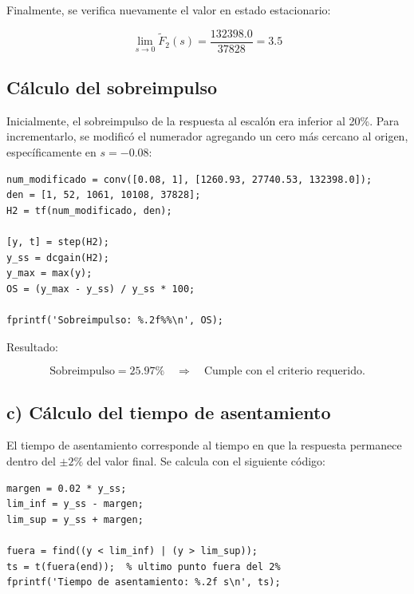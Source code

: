 \documentclass[11pt,letterpaper]{article}
\begin{document}
Finalmente, se verifica nuevamente el valor en estado estacionario:

\begin{equation}
\lim_{s \to 0} \tilde{F}_2(s) = \frac{132398.0}{37828} = \boxed{3.5}
\end{equation}

\subsection{Cálculo del sobreimpulso}

Inicialmente, el sobreimpulso de la respuesta al escalón era inferior al 20\%. Para incrementarlo, se modificó el numerador agregando un cero más cercano al origen, específicamente en $s = -0.08$:

\begin{lstlisting}[caption={Modificación del numerador para ajustar sobreimpulso}]
num_modificado = conv([0.08, 1], [1260.93, 27740.53, 132398.0]);
den = [1, 52, 1061, 10108, 37828];
H2 = tf(num_modificado, den);

[y, t] = step(H2);
y_ss = dcgain(H2);
y_max = max(y);
OS = (y_max - y_ss) / y_ss * 100;

fprintf('Sobreimpulso: %.2f%%\n', OS);
\end{lstlisting}

Resultado:

\begin{equation}
\text{Sobreimpulso} = 25.97\% \quad \Rightarrow \quad \text{Cumple con el criterio requerido.}
\end{equation}

\vspace{1em}

\subsection*{c) Cálculo del tiempo de asentamiento}

El tiempo de asentamiento corresponde al tiempo en que la respuesta permanece dentro del $\pm2\%$ del valor final. Se calcula con el siguiente código:

\begin{lstlisting}[caption={Cálculo del tiempo de asentamiento}]
margen = 0.02 * y_ss;
lim_inf = y_ss - margen;
lim_sup = y_ss + margen;

fuera = find((y < lim_inf) | (y > lim_sup));
ts = t(fuera(end));  % ultimo punto fuera del 2%
fprintf('Tiempo de asentamiento: %.2f s\n', ts);
\end{lstlisting}
\end{document}
